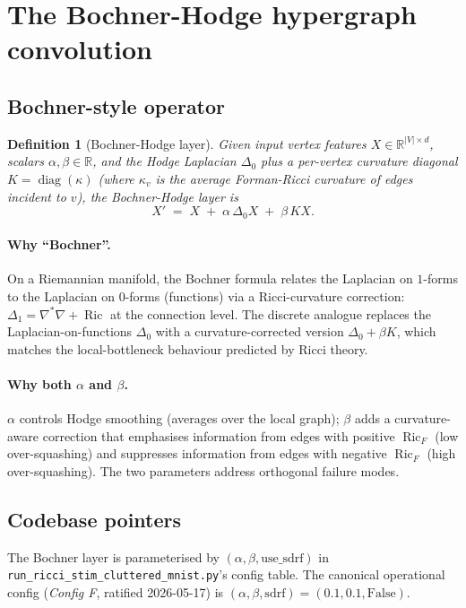 \documentclass[11pt,a4paper]{article}
\newtheorem{definition}[theorem]{Definition}
\theoremstyle{remark}
\DeclareMathOperator{\diag}{diag}
\DeclareMathOperator{\Ric}{Ric}
\newcommand{\R}{\mathbb{R}}
\begin{document}
\section{The Bochner-Hodge hypergraph convolution}

\subsection{Bochner-style operator}

\begin{definition}[Bochner-Hodge layer]
Given input vertex features $X \in \R^{|V| \times d}$, scalars
$\alpha, \beta \in \R$, and the Hodge Laplacian $\Delta_0$ plus a
per-vertex curvature diagonal $K = \diag(\kappa)$ (where $\kappa_v$
is the average Forman-Ricci curvature of edges incident to $v$),
the Bochner-Hodge layer is
\[
  X' \;=\; X \;+\; \alpha \, \Delta_0 X
              \;+\; \beta \, K X.
\]
\end{definition}

\paragraph{Why ``Bochner''.} On a Riemannian manifold, the Bochner
formula relates the Laplacian on $1$-forms to the Laplacian on
$0$-forms (functions) via a Ricci-curvature correction:
$\Delta_1 = \nabla^* \nabla + \Ric$ at the connection level. The
discrete analogue replaces the Laplacian-on-functions $\Delta_0$
with a curvature-corrected version $\Delta_0 + \beta K$, which
matches the local-bottleneck behaviour predicted by Ricci theory.

\paragraph{Why both $\alpha$ and $\beta$.} $\alpha$ controls
Hodge smoothing (averages over the local graph); $\beta$ adds a
curvature-aware correction that emphasises information from
edges with positive $\Ric_F$ (low over-squashing) and suppresses
information from edges with negative $\Ric_F$ (high over-squashing).
The two parameters address orthogonal failure modes.

\subsection{Codebase pointers}

The Bochner layer is parameterised by $(\alpha, \beta, \text{use\_sdrf})$
in \texttt{run\_ricci\_stim\_cluttered\_mnist.py}'s config table.
The canonical operational config (\emph{Config F}, ratified 2026-05-17)
is $(\alpha, \beta, \text{sdrf}) = (0.1, 0.1, \text{False})$.
\end{document}

